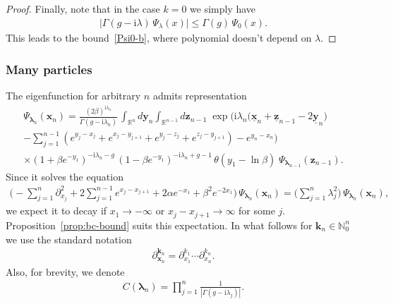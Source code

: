 \documentclass[11pt]{article}
\numberwithin{equation}{section}
\theoremstyle{plain}
\theoremstyle{definition}
\renewcommand{\imath}{\mathrm{i}}
\begin{document}
\begin{proof}
	Finally, note that in the case $k = 0$ we simply have
	\begin{align}
		\bigl| \Gamma(g - \imath \lambda) \, \Psi_\lambda(x) \bigr| \leq \Gamma(g) \, \Psi_0(x).
	\end{align}
	This leads to the bound~\eqref{Psi0-b}, where polynomial doesn't depend on $\lambda$.
\end{proof}

\subsubsection{Many particles}

The eigenfunction for arbitrary $n$ admits representation
\begin{multline}\label{Psin}
	\Psi_{\bm{\lambda}_n}(\bm{x}_n) = \frac{(2\beta)^{\imath \lambda_n}}{\Gamma(g - \imath \lambda_n)} \, \int_{\mathbb{R}^n} d\bm{y}_n \int_{\mathbb{R}^{n - 1}} d\bm{z}_{n - 1} \; \exp \Biggl( \imath \lambda_n \bigl( \underline{\bm{x}}_n + \underline{\bm{z}}_{n - 1} - 2 \underline{\bm{y}}_n \bigr)  \\[4pt]
	- \sum_{j = 1}^{n - 1} ( e^{y_j - x_j} + e^{x_j - y_{j + 1}}  + e^{y_j - z_j} + e^{z_j - y_{j + 1}} ) - e^{y_n - x_n} \Biggr) \\[4pt]
	\times (1 + \beta e^{-y_1})^{- \imath \lambda_n - g} \, (1 - \beta e^{-y_1})^{- \imath \lambda_n + g - 1} \, \theta(y_1 - \ln \beta) \; \Psi_{\bm{\lambda}_{n - 1}}(\bm{z}_{n - 1}).
\end{multline}
Since it solves the equation
\begin{align}
	\Biggl( - \sum_{j = 1}^n \partial_{x_j}^2 + 2\sum_{j = 1}^{n - 1} e^{x_j - x_{j + 1}} + 2\alpha e^{-x_1} + \beta^2 e^{-2x_1} \Biggr) \, \Psi_{\bm{\lambda}_n}(\bm{x}_n) = \Biggl( \sum_{j = 1}^n \lambda_j^2 \Biggr) \, \Psi_{\bm{\lambda}_n}(\bm{x}_n) ,
\end{align}
we expect it to decay if $x_1 \to - \infty$ or $x_{j} - x_{j + 1} \to \infty$ for some $j$. Proposition~\ref{prop:bc-bound} suits this expectation. In what follows for $\bm{k}_n \in \mathbb{N}_0^n$ we use the standard notation
\begin{align} \label{dkn}
	\partial_{\bm{x}_n}^{\bm{k}_n} = \partial_{x_1}^{k_1} \cdots \partial_{x_n}^{k_n}.
\end{align}
Also, for brevity, we denote
\begin{align}
	C(\bm{\lambda}_n) = \prod_{j = 1}^n \frac{1}{| \Gamma(g - \imath \lambda_j)| }.
\end{align}
\end{document}

